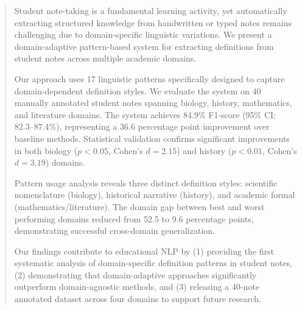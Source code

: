 \begin{abstract}
Student note-taking is a fundamental learning activity, yet automatically extracting structured knowledge from handwritten or typed notes remains challenging due to domain-specific linguistic variations. We present a domain-adaptive pattern-based system for extracting definitions from student notes across multiple academic domains.

Our approach uses 17 linguistic patterns specifically designed to capture domain-dependent definition styles. We evaluate the system on 40 manually annotated student notes spanning biology, history, mathematics, and literature domains. The system achieves 84.9\% F1-score (95\% CI: 82.3--87.4\%), representing a 36.6 percentage point improvement over baseline methods. Statistical validation confirms significant improvements in both biology ($p < 0.05$, Cohen's $d = 2.15$) and history ($p < 0.01$, Cohen's $d = 3.19$) domains.

Pattern usage analysis reveals three distinct definition styles: scientific nomenclature (biology), historical narrative (history), and academic formal (mathematics/literature). The domain gap between best and worst performing domains reduced from 52.5 to 9.6 percentage points, demonstrating successful cross-domain generalization.

Our findings contribute to educational NLP by (1) providing the first systematic analysis of domain-specific definition patterns in student notes, (2) demonstrating that domain-adaptive approaches significantly outperform domain-agnostic methods, and (3) releasing a 40-note annotated dataset across four domains to support future research.
\end{abstract}

